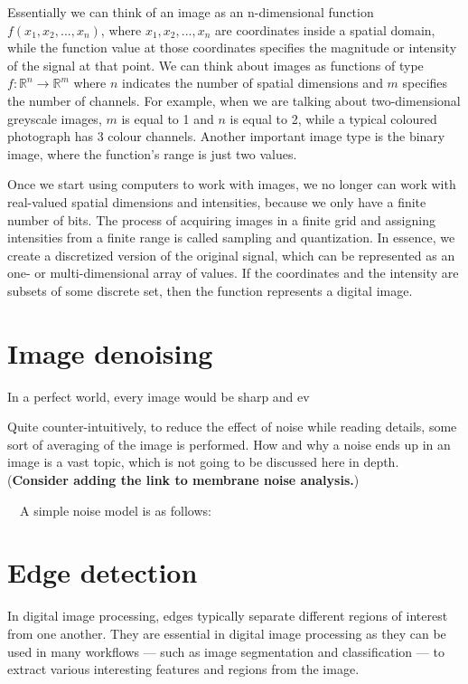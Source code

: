 \documentclass[
  digital,     %
  oneside,     %
  nosansbold,  %
  nocolorbold, %
  lof,         %
  lot,         %
]{fithesis4}
\newcommand*{\R}{\ensuremath{\mathbb{R}}}
\begin{document}
Essentially we can think of an image as an n-dimensional function $f(x_1, x_2,
..., x_n)$, where $x_1, x_2, ..., x_n$ are coordinates inside a spatial domain,
while the function value at those coordinates specifies the magnitude or
intensity of the signal at that point. We can think about images as functions of
type $f:\R^n \rightarrow \R^m$ where $n$ indicates the number of spatial
dimensions and $m$ specifies the number of channels. For example, when we are
talking about two-dimensional greyscale images, $m$ is equal to 1 and $n$ is
equal to 2, while a typical coloured photograph has 3 colour channels. Another
important image type is the binary image, where the function's range is just two
values.

Once we start using computers to work with images, we no longer can work with
real-valued spatial dimensions and intensities, because we only have a finite
number of bits. The process of acquiring images in a finite grid and assigning
intensities from a finite range is called sampling and quantization. In essence,
we create a discretized version of the original signal, which can be represented
as an one- or multi-dimensional array of values. If the coordinates and the
intensity are subsets of some discrete set, then the function represents a
digital image.

\section{Image denoising}

In a perfect world, every image would be sharp and ev

Quite counter-intuitively, to reduce the effect of noise while reading details,
some sort of averaging of the image is performed. How and why a noise ends up in
an image is a vast topic, which is not going to be discussed here in depth.
(\textbf{Consider adding the link to membrane noise analysis.}) 

~~A simple noise
model is as follows:~


\section{Edge detection}

In digital image processing, edges typically separate different regions of
interest from one another. They are essential in digital image processing
as they can be used in many workflows --- such as image segmentation and
classification --- to extract various interesting features and regions
from the image.
\end{document}
